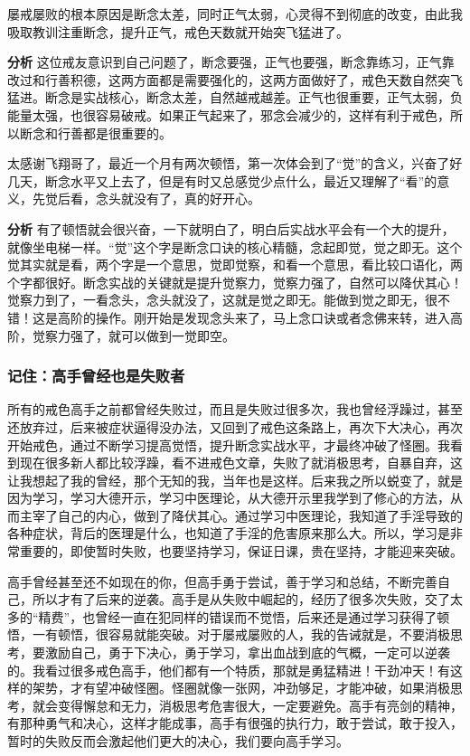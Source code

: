 \begin{case}
    屡戒屡败的根本原因是断念太差，同时正气太弱，心灵得不到彻底的改变，由此我吸取教训注重断念，提升正气，戒色天数就开始突飞猛进了。

    \textbf{分析} 这位戒友意识到自己问题了，断念要强，正气也要强，断念靠练习，正气靠改过和行善积德，这两方面都是需要强化的，这两方面做好了，戒色天数自然突飞猛进。断念是实战核心，断念太差，自然越戒越差。正气也很重要，正气太弱，负能量太强，也很容易破戒。如果正气起来了，邪念会减少的，这样有利于戒色，所以断念和行善都是很重要的。
\end{case}

\begin{case}
    太感谢飞翔哥了，最近一个月有两次顿悟，第一次体会到了“觉”的含义，兴奋了好几天，断念水平又上去了，但是有时又总感觉少点什么，最近又理解了“看”的意义，先觉后看，念头就没有了，真的好开心。

    \textbf{分析} 有了顿悟就会很兴奋，一下就明白了，明白后实战水平会有一个大的提升，就像坐电梯一样。“觉”这个字是断念口诀的核心精髓，念起即觉，觉之即无。这个觉其实就是看，两个字是一个意思，觉即觉察，和看一个意思，看比较口语化，两个字都很好。断念实战的关键就是提升觉察力，觉察力强了，自然可以降伏其心！觉察力到了，一看念头，念头就没了，这就是觉之即无。能做到觉之即无，很不错！这是高阶的操作。刚开始是发现念头来了，马上念口诀或者念佛来转，进入高阶，觉察力强了，就可以做到一觉即空。
\end{case}

\subsubsection{记住：高手曾经也是失败者}

所有的戒色高手之前都曾经失败过，而且是失败过很多次，我也曾经浮躁过，甚至还放弃过，后来被症状逼得没办法，又回到了戒色这条路上，再次下大决心，再次开始戒色，通过不断学习提高觉悟，提升断念实战水平，才最终冲破了怪圈。我看到现在很多新人都比较浮躁，看不进戒色文章，失败了就消极思考，自暴自弃，这让我想起了我的曾经，那个无知的我，当年也是这样。后来我之所以蜕变了，就是因为学习，学习大德开示，学习中医理论，从大德开示里我学到了修心的方法，从而主宰了自己的内心，做到了降伏其心。通过学习中医理论，我知道了手淫导致的各种症状，背后的医理是什么，也知道了手淫的危害原来那么大。所以，学习是非常重要的，即使暂时失败，也要坚持学习，保证日课，贵在坚持，才能迎来突破。

高手曾经甚至还不如现在的你，但高手勇于尝试，善于学习和总结，不断完善自己，所以才有了后来的逆袭。高手是从失败中崛起的，经历了很多次失败，交了太多的“精费”，也曾经一直在犯同样的错误而不觉悟，后来还是通过学习获得了顿悟，一有顿悟，很容易就能突破。对于屡戒屡败的人，我的告诫就是，不要消极思考，要激励自己，勇于下决心，勇于学习，拿出血战到底的气概，一定可以逆袭的。我看过很多戒色高手，他们都有一个特质，那就是勇猛精进！干劲冲天！有这样的架势，才有望冲破怪圈。怪圈就像一张网，冲劲够足，才能冲破，如果消极思考，就会变得懈怠和无力，消极思考危害很大，一定要避免。高手有亮剑的精神，有那种勇气和决心，这样才能成事，高手有很强的执行力，敢于尝试，敢于投入，暂时的失败反而会激起他们更大的决心，我们要向高手学习。

